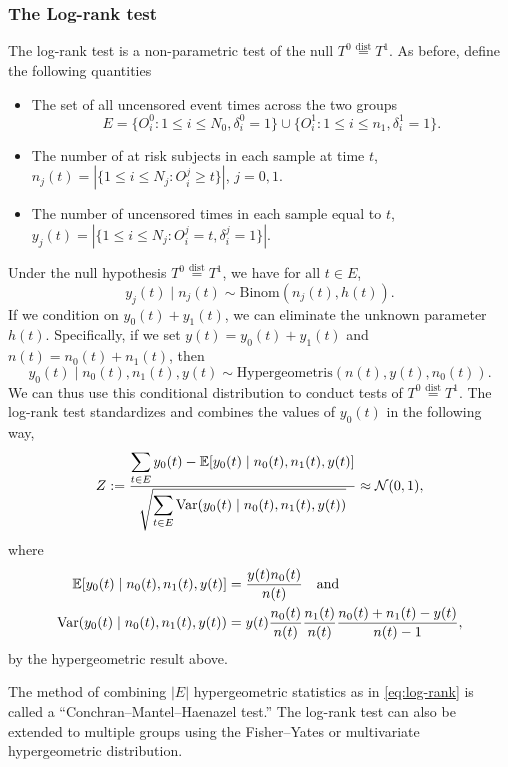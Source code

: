 \subsubsection*{The Log-rank test}

The log-rank test is a non-parametric test of the null $T^0 \stackrel{\text{dist}}{=} T^1$. As before, define the following quantities 

\begin{itemize}
    \item The set of all uncensored event times across the two groups \[
        E = \{O_i^0 : 1 \le i \le N_0, \delta_i^0=1\} \cup \{O_i^1 : 1 \le i \le n_1, \delta_i^1=1\}.
        \]
    \item The number of at risk subjects in each sample at time $t$, $n_j(t) = |\{1 \le i \le N_j : O_i^j \ge t\}|$, $j=0,1$.
    \item The number of uncensored times in each sample equal to $t$, $y_j(t) = |\{1 \le i \le N_j : O_i^j =t, \delta_i^j=1\}|$. 
\end{itemize}
Under the null hypothesis $T^0  \stackrel{\text{dist}}{=} T^1$, we have for all $t \in E$, 
\[y_j(t) \mid n_j(t) \sim \mathrm{Binom}(n_j(t), h(t)). \]
If we condition on $y_0(t)+y_1(t)$, we can eliminate the unknown parameter $h(t)$. Specifically, if we set $y(t)=y_0(t)+y_1(t)$ and $n(t)=n_0(t)+n_1(t)$, then
\[y_0(t)\mid n_0(t),n_1(t), y(t) \sim \mathrm{Hypergeometris}(n(t), y(t), n_0(t)). \]
We can thus use this conditional distribution to conduct tests of $T^0 \stackrel{\text{dist}}{=} T^1$.  The log-rank test standardizes and combines the values of $y_0(t)$ in the following way,
\begin{equation}\label{eq:log-rank}
    Z := \frac{\displaystyle{\sum_{t \in E} y_0(t) - {\mathbb E}[y_0(t) \mid n_0(t),n_1(t),y(t)]}}{\displaystyle{\sqrt{\sum_{t \in E} \mathrm{Var}(y_0(t)\mid n_0(t), n_1(t), y(t))}}} \approx {\mathcal N}(0,1),
\end{equation}
where 
\begin{align*}
    {\mathbb E}[y_0(t) \mid n_0(t),n_1(t), y(t)] &= \frac{y(t)n_0(t)}{n(t)} \quad \text{and }\\
    \mathrm{Var}(y_0(t)\mid n_0(t), n_1(t), y(t)) &= y(t)\frac{n_0(t)}{n(t)}\frac{n_1(t)}{n(t)}\frac{n_0(t)+n_1(t)-y(t)}{n(t)-1},\\
\end{align*} 
by the hypergeometric result above. 

The method of combining $|E|$ hypergeometric statistics as in \eqref{eq:log-rank} is called a ``Conchran--Mantel--Haenazel test.'' The log-rank test can also be extended to multiple groups using the Fisher--Yates or multivariate hypergeometric distribution.

